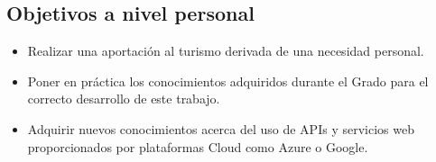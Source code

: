 \subsection{Objetivos a nivel personal}
\begin{itemize}
	\item Realizar una aportación al turismo derivada de una necesidad personal.
	\item Poner en práctica los conocimientos adquiridos durante el Grado para el correcto desarrollo de este trabajo.
	\item Adquirir nuevos conocimientos acerca del uso de APIs y servicios web proporcionados por plataformas Cloud como Azure o Google.
\end{itemize}
